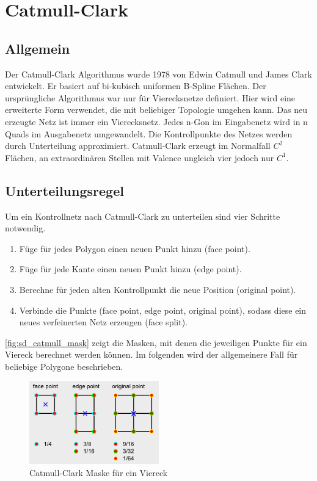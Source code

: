 \section{Catmull-Clark}

\subsection{Allgemein}

Der Catmull-Clark Algorithmus wurde 1978 von Edwin Catmull und James Clark entwickelt.
Er basiert auf bi-kubisch uniformen B-Spline Flächen.
Der ursprüngliche Algorithmus war nur für Vierecksnetze definiert.
Hier wird eine erweiterte Form verwendet, die mit beliebiger Topologie umgehen kann.
Das neu erzeugte Netz ist immer ein Vierecksnetz.
Jedes n-Gon im Eingabenetz wird in n Quads
im Ausgabenetz umgewandelt.
Die Kontrollpunkte des Netzes werden durch Unterteilung approximiert.
Catmull-Clark erzeugt im Normalfall \(C^2\) Flächen,
an extraordinären Stellen mit Valence ungleich vier jedoch
nur \(C^1\).
\cite[S. 75ff]{Zorin.subdivcourse} \cite[S. 52ff]{Standford.24.07.2015}


\subsection{Unterteilungsregel}

Um ein Kontrollnetz nach Catmull-Clark zu unterteilen sind vier Schritte notwendig.
\begin{enumerate}
	\item Füge für jedes Polygon einen neuen Punkt hinzu (face point).
	\item Füge für jede Kante einen neuen Punkt hinzu (edge point).
	\item Berechne für jeden alten Kontrollpunkt die neue Position (original point).
	\item Verbinde die Punkte (face point, edge point, original point), sodass diese ein
	neues verfeinerten Netz erzeugen (face split).
\end{enumerate}

\autoref{fig:sd_catmull_mask} zeigt die Masken, mit denen die jeweiligen Punkte für ein Viereck berechnet werden können.
Im folgenden wird der allgemeinere Fall für beliebige Polygone beschrieben.
\begin{figure}
\centering
\includegraphics[width=0.5\textwidth]{content/media/sd_catmull_mask.png}
\caption{Catmull-Clark Maske für ein Viereck \cite{yoshihitoyagi.23.12.2015}}
\label{fig:sd_catmull_mask}
\end{figure}

